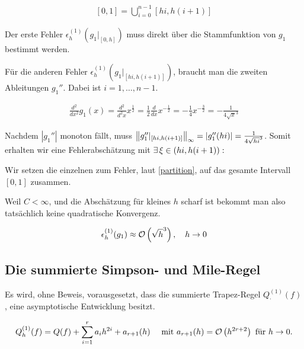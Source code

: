 \begin{align} \label{partition}
    [0, 1] = \bigcup_{i=0}^{n-1} [hi, h(i+1)]
\end{align}

Der erste Fehler $\epsilon_h^{(1)}(g_1|_{[0, h]})$ muss direkt über die Stammfunktion von $g_1$ bestimmt werden.



Für die anderen Fehler $\epsilon_h^{(1)}(g_1|_{[hi, h(i+1)]})$, braucht man die zweiten Ableitungen $g_1''$. Dabei ist $i = 1, \ldots, n-1$.

\begin{align*}
    \frac{d^2}{dx^2} g_1(x)
    = \frac{d^2}{d^2x} x^{\frac{1}{2}}
    = \frac{1}{2} \frac{d}{dx} x^{-\frac{1}{2}}
    = - \frac{1}{4} x^{-\frac{3}{2}}
    = - \frac{1}{4 \sqrt{x}^3}
\end{align*}

Nachdem $|g_1''|$ monoton fällt, muss $\norm[\infty]{g_1''|_{[hi, h(i+1)]}} = \vbraces{g_1''(hi)} = \frac{1}{4 \sqrt{hi}^3}$. Somit erhalten wir eine Fehlerabschätzung mit $\Exists \xi \in (hi, h(i+1)):$



Wir setzen die einzelnen zum Fehler, laut \eqref{partition}, auf das gesamte Intervall $[0, 1]$ zusammen.



Weil $C < \infty$, und die Abschätzung für kleines $h$ scharf ist bekommt man also tatsächlich keine quadratische Konvergenz.

\begin{align*}
    \epsilon_h^{(1)}(g_1)
    \approx
    \Landau{\sqrt{h}^3}, \quad
    h \to 0
\end{align*}

\subsection{Die summierte Simpson- und Mile-Regel}

Es wird, ohne Beweis, vorausgesetzt, dass die summierte Trapez-Regel $Q_\cdot^{(1)}(f)$, eine asymptotische Entwicklung besitzt.

\begin{align} \label{asymptotisch}
    Q_h^{(1)}(f) =
    Q(f) +
    \sum_{i=1}^r a_i h^{2i} +
    a_{r+1}(h)
    \quad \text{ mit }
    a_{r+1}(h) = \Landau{h^{2r+2}}
    \text{ für }
    h \to 0.
\end{align}

